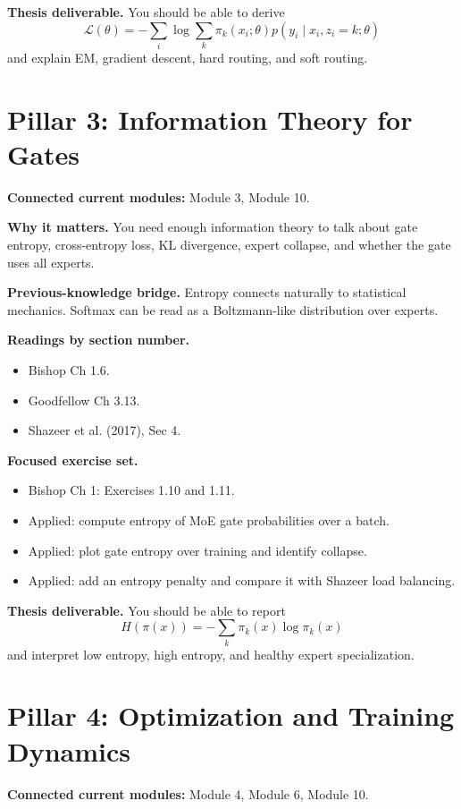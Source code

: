 \documentclass[11pt]{article}
\begin{document}
\textbf{Thesis deliverable.} You should be able to derive
\[
\mathcal{L}(\theta) =
-\sum_i \log \sum_k \pi_k(x_i;\theta)p(y_i \mid x_i,z_i=k;\theta)
\]
and explain EM, gradient descent, hard routing, and soft routing.

\section{Pillar 3: Information Theory for Gates}

\textbf{Connected current modules:} Module 3, Module 10.

\textbf{Why it matters.} You need enough information theory to talk about gate entropy, cross-entropy loss, KL divergence, expert collapse, and whether the gate uses all experts.

\textbf{Previous-knowledge bridge.} Entropy connects naturally to statistical mechanics. Softmax can be read as a Boltzmann-like distribution over experts.

\textbf{Readings by section number.}
\begin{itemize}
  \item Bishop Ch 1.6.
  \item Goodfellow Ch 3.13.
  \item Shazeer et al. (2017), Sec 4.
\end{itemize}

\textbf{Focused exercise set.}
\begin{itemize}
  \item Bishop Ch 1: Exercises 1.10 and 1.11.
  \item Applied: compute entropy of MoE gate probabilities over a batch.
  \item Applied: plot gate entropy over training and identify collapse.
  \item Applied: add an entropy penalty and compare it with Shazeer load balancing.
\end{itemize}

\textbf{Thesis deliverable.} You should be able to report
\[
H(\pi(x)) = -\sum_k \pi_k(x)\log \pi_k(x)
\]
and interpret low entropy, high entropy, and healthy expert specialization.

\section{Pillar 4: Optimization and Training Dynamics}

\textbf{Connected current modules:} Module 4, Module 6, Module 10.
\end{document}
